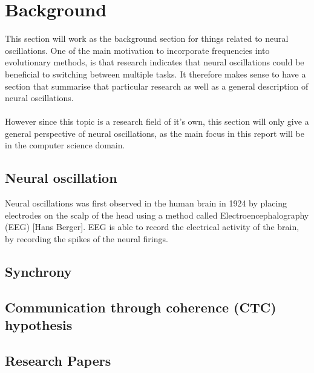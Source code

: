 \documentclass[11pt, a4paper]{article}
\begin{document}
\author{Mads Anthony}
\section{Background}
This section will work as the background section for things related to neural oscillations. One of the main motivation to incorporate frequencies into evolutionary methods, is that research indicates that neural oscillations could be beneficial to switching between multiple tasks. It therefore makes sense to have a section that summarise that particular research as well as a general description of neural oscillations.
\\
\\
However since this topic is a research field of it's own, this section will only give a general perspective of neural oscillations, as the main focus in this report will be in the computer science domain.
\subsection{Neural oscillation}
Neural oscillations was first observed in the human brain in 1924 by placing electrodes on the scalp of the head using a method called Electroencephalography (EEG) [Hans Berger]. EEG is able to record the electrical activity of the brain, by recording the spikes of the neural firings.
\subsection{Synchrony}
\subsection{Communication through coherence (CTC) hypothesis}
\subsection{Research Papers}
\end{document}
